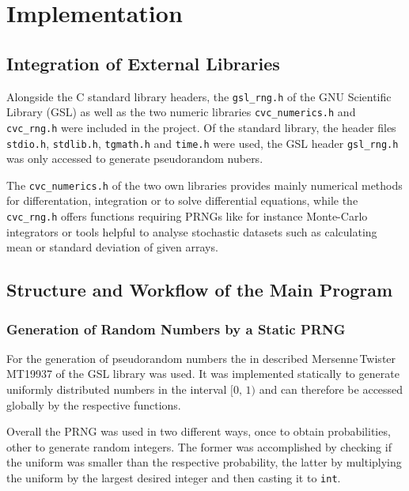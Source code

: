 \section{Implementation}

\subsection{Integration of External Libraries}

Alongside the C standard library headers, the \texttt{gsl\_rng.h} of the GNU Scientific Library (GSL) as well as the two numeric libraries \texttt{cvc\_numerics.h} and \texttt{cvc\_rng.h} were included in the project. 
Of the standard library, the header files \texttt{stdio.h}, \texttt{stdlib.h}, \texttt{tgmath.h} and \texttt{time.h} were used, the GSL header \texttt{gsl\_rng.h} was only accessed to generate pseudorandom nubers. 

The \texttt{cvc\_numerics.h} of the two own libraries provides mainly numerical methods for differentation, integration or to solve differential equations, while the \texttt{cvc\_rng.h} offers functions requiring PRNGs
like for instance Monte-Carlo integrators or tools helpful to analyse stochastic datasets such as calculating mean or standard deviation of given arrays.


\subsection{Structure and Workflow of the Main Program}

\subsubsection{Generation of Random Numbers by a Static PRNG}

For the generation of pseudorandom numbers the in  described Mer\-sen\-ne\,Twis\-ter MT19937 of the GSL library was used. It was implemented statically 
to generate uniformly distributed numbers in the interval $[0,\,1)$ and can therefore be accessed globally by the respective functions. 

Overall the PRNG was used in two different ways, once to obtain probabilities, other to generate random integers.
The former was accomplished by checking if the uniform was smaller than the respective probability, the latter by multiplying the uniform by the largest desired integer and then casting it to \texttt{int}.


